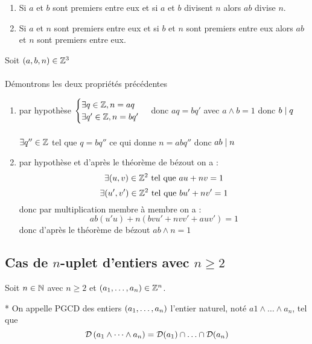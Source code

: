 \begin{prop}
	\begin{enumerate}
		\item Si \(a\) et \(b\) sont premiers entre eux et si \(a\) et \(b\) divisent \(n\) alors \(ab\) divise \(n\).
		\item Si \(a\) et \(n\) sont premiers entre eux et si \(b\) et \(n\) sont premiers entre eux alors \(ab\) et \(n\) sont premiers
		      entre eux.
	\end{enumerate}
\end{prop}

\begin{dem}
	Soit \((a,b,n) \in \mathbb{Z}^3\)\\~\\
	Démontrons les deux propriétés précédentes
	\begin{enumerate}
		\item par hypothèse \(\begin{cases}
			      \exists q \in \mathbb{Z}, n=aq \\
			      \exists q' \in \mathbb{Z}, n=bq'
		      \end{cases}\)
		      donc \(aq = bq'\) avec \(a\wedge b = 1\) donc \(b\mid q\)\\~\\
		      \(\exists q'' \in \mathbb{Z}\) tel que \(q = bq''\) ce qui donne \(n = abq''\) donc \(ab \mid n\)
		\item par hypothèse et d'après le théorème de bézout on a :
		      \[\exists (u,v) \in \mathbb{Z}^2 \text{ tel que } au+nv=1\]
		      \[\exists (u',v') \in \mathbb{Z}^2 \text{ tel que } bu'+nv'=1\]
		      donc par multiplication membre à membre on a  :
		      \[ab(u'u) + n(bvu' + nvv'+auv') = 1\]
		      donc d'après le théorème de bézout \(ab \wedge n =1\)
	\end{enumerate}
\end{dem}

\subsection{Cas de \(n\)-uplet d’entiers avec \( n \geq 2\) }
Soit \(n \in \mathbb{N}\) avec \(n \geq 2\) et \((a_1, \dots , a_n) \in \mathbb{Z}^n\).

\begin{defprop}*
	On appelle PGCD des entiers \(\left(a_1, \dots , a_n\right)\) l’entier naturel, noté \(a1 \wedge \dots \wedge a_n\), tel que
	\[\mathcal{D}\paren{a_1 \wedge \dots \wedge a_n} = \mathcal{D}(a_1) \inter \dots \inter \mathcal{D}(a_n)\]
\end{defprop}


